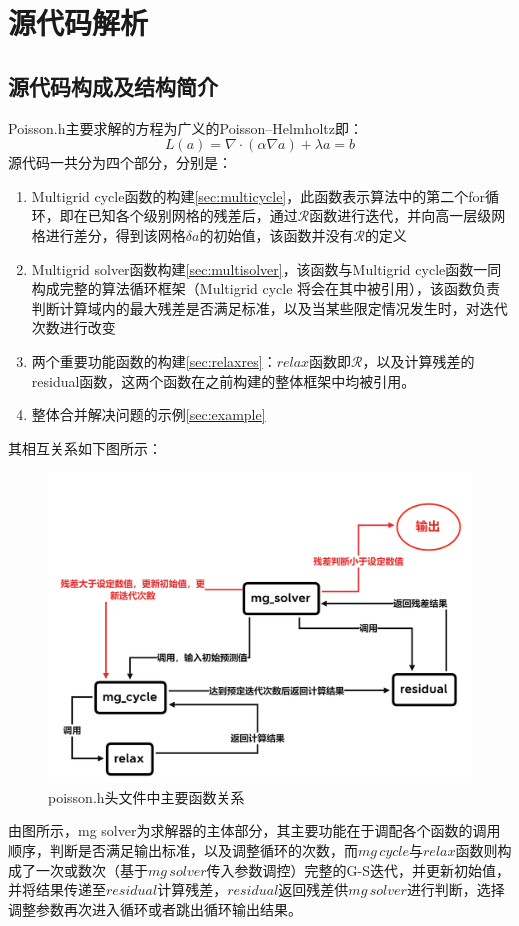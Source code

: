 \documentclass[lang=cn,11pt,a4paper]{elegantpaper}
\begin{document}
\section{源代码解析}
\subsection{源代码构成及结构简介}
Poisson.h主要求解的方程为广义的Poisson–Helmholtz即：
\begin{equation}\label{equ:L}
    L(a) = \nabla\cdot (\alpha\nabla a)+\lambda a=b
\end{equation}
源代码一共分为四个部分，分别是：
\begin{enumerate}
    \item Multigrid cycle函数的构建\ref{sec:multicycle}，此函数表示算法中的第二个for循环，即在已知各个级别网格的残差后，通过$\mathscr{R}$函数进行迭代，并向高一层级网格进行差分，得到该网格$\delta a$的初始值，该函数并没有$\mathscr{R}$的定义
    \item Multigrid solver函数构建\ref{sec:multisolver}，该函数与Multigrid cycle函数一同构成完整的算法循环框架（Multigrid cycle 将会在其中被引用），该函数负责判断计算域内的最大残差是否满足标准，以及当某些限定情况发生时，对迭代次数进行改变
    \item 两个重要功能函数的构建\ref{sec:relaxres}：$relax$函数即$\mathscr{R}$，以及计算残差的residual函数，这两个函数在之前构建的整体框架中均被引用。
    \item 整体合并解决问题的示例\ref{sec:example}
\end{enumerate}
其相互关系如下图所示：
\begin{figure}[h]
  \centering
  \includegraphics[scale=0.3]{poisson.png}
  \caption{poisson.h头文件中主要函数关系}
\end{figure}
由图所示，mg solver为求解器的主体部分，其主要功能在于调配各个函数的调用顺序，判断是否满足输出标准，以及调整循环的次数，而$mg\,cycle$与$relax$函数则构成了一次或数次（基于$mg\,solver$传入参数调控）完整的G-S迭代，并更新初始值，并将结果传递至$residual$计算残差，$residual$返回残差供$mg\,solver$进行判断，选择调整参数再次进入循环或者跳出循环输出结果。
\end{document}
